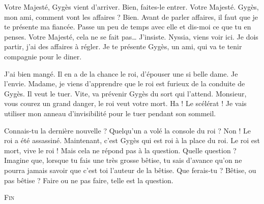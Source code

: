 \documentclass[12pt, a5paper, french]{memoir}
\begin{document}
\begin{linenumbers}
\begin{drama}
\scene[La fiancée]
\StageDir{\Gyges, \Candaule, \Nyssia, \Laurel}
\Laurelspeaks Votre Majesté, Gygès vient d’arriver.
\Candaulespeaks Bien, faites-le entrer.
\Gygesspeaks Votre Majesté.
\Candaulespeaks Gygès, mon ami, comment vont les affaires ?
\Gygesspeaks Bien.
\Candaulespeaks Avant de parler affaires, il faut que je te présente ma fiancée. Passe un peu de temps avec elle et dis-moi ce que tu en penses.
\Gygesspeaks Votre Majesté, cela ne se fait pas\dots
\Candaulespeaks J’insiste.  Nyssia, viens voir ici. Je dois partir, j’ai des affaires à régler. Je te présente Gygès, un ami, qui va te tenir compagnie pour le diner.
\newpage

\scene[L’assassinat]
\StageDir{\Gyges, \Nyssia, \Hardy}
\Gygesspeaks {} J’ai bien mangé. Il en a de la chance le roi, d’épouser une si belle dame. Je l’envie.
\Hardyspeaks Madame, je viens d’apprendre que le roi est furieux de la conduite de Gygès. Il veut le tuer.
\Nyssiaspeaks Vite, va prévenir Gygès du sort qui l’attend.
\Hardyspeaks Monsieur, vous courez un grand danger, le roi veut votre mort.
\Gygesspeaks Ha ! Le scélérat ! Je vais utiliser mon anneau d’invisibilité pour le tuer pendant son sommeil.
\newpage

\scene[La question]
\StageDir{\Bonnie, \Clyde}
\Bonniespeaks Connais-tu la dernière nouvelle ?
\Clydespeaks Quelqu’un a volé la console du roi ?
\Bonniespeaks Non ! Le roi a été assassiné. Maintenant, c’est Gygès qui est roi à la place du roi.
\Clydespeaks Le roi est mort, vive le roi !
\Bonniespeaks Mais cela ne répond pas à la question.
\Clydespeaks Quelle question ?
\Bonniespeaks Imagine que, lorsque tu fais une très grosse bêtise, tu sais d’avance qu’on ne pourra jamais savoir que c’est toi l’auteur de la bêtise. Que ferais-tu ? Bêtise, ou pas bêtise ? Faire ou ne pas faire, telle est la question.

\end{drama}
\end{linenumbers}

\centering
\vfill
\textsc{Fin}
\vfill
\thispagestyle{empty}
\end{document}
